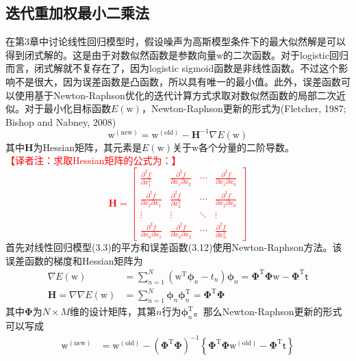 \documentclass[b5paper]{book}
\numberwithin{equation}{chapter}
\newcommand {\bw} {\boldsymbol{\mathrm{w}}}
\newcommand {\sft} {\boldsymbol{\mathsf{t}}}
\newcommand {\rmT} {\mathrm{T}}
\newcommand {\bfPhi} {\boldsymbol{\Phi}}
\newcommand {\bfphi} {\boldsymbol{\phi}}
\begin{document}
	\subsection{迭代重加权最小二乘法}
	\textnormal{在第3章中讨论线性回归模型时，假设噪声为高斯模型条件下的最大似然解是可以得到闭式解的。这是由于对数似然函数是参数向量$\bw$的二次函数。对于logistic回归而言，闭式解就不复存在了，因为logistic sigmoid函数是非线性函数。不过这个影响不是很大，因为误差函数是凸函数，所以具有唯一的最小值。此外，误差函数可以使用基于Newton-Raphson优化的迭代计算方式求取对数似然函数的局部二次近似。对于最小化目标函数$E(\bw)$，Newton-Raphson更新的形式为(Fletcher, 1987; Bishop and Nabney, 2008)
	\begin{equation}
		\bw^{(\mathrm{new})} = \bw^{(\mathrm{old})} - \mathbf{H}^{-1} \nabla E(\bw)
	\end{equation}
	其中$\mathbf{H}$为Hessian矩阵，其元素是$E(\bw)$关于$\bw$各个分量的二阶导数。\\
	\textcolor{red}{【译者注：求取Hessian矩阵的公式为：】
	\begin{equation*}
		\mathbf{H} = \left[\begin{matrix}
			\frac{\partial^2f}{\partial x_1^2} & \frac{\partial^2f}{\partial x_1 \partial x_2} & \cdots & \frac{\partial^2f}{\partial x_1 \partial x_n}\\
			\frac{\partial^2f}{\partial x_2 \partial x_1} & \frac{\partial^2f}{\partial x^2_2} & \cdots & \frac{\partial^2f}{\partial x_2 \partial x_n}\\
			\vdots & \vdots & \ddots & \vdots \\
			\frac{\partial^2f}{\partial x_n \partial x_1} & \frac{\partial^2f}{\partial x_n \partial x_2} & \cdots & \frac{\partial^2f}{\partial x^2_n}
		\end{matrix}\right]
	\end{equation*}}
	\indent 首先对线性回归模型(3.3)的平方和误差函数(3.12)使用Newton-Raphson方法。该误差函数的梯度和Hessian矩阵为
	\begin{align}
		\nabla E(\bw) &= \sum_{n=1}^N (\bw^{\rmT}\bfphi_n - t_n)\bfphi_n = \bfPhi^{\rmT}\bfPhi \bw - \bfPhi^{\rmT} \sft \\
		\mathbf{H} = \nabla \nabla E(\bw) &= \sum_{n=1}^N \bfphi_n \bfphi_n^{\rmT} = \bfPhi^{\rmT} \bfPhi
	\end{align}
	其中$\bfPhi$为$N \times M$维的设计矩阵，其第$n$行为$\bfphi_n^{\rmT}$。那么Newton-Raphson更新的形式可以写成
	\begin{equation}
	\begin{split}
		\bw^{\mathrm{(new)}} &= \bw^{\mathrm{(old)}} - \left(\bfPhi^{\rmT} \bfPhi \right)^{-1} \left\{\bfPhi^{\rmT}\bfPhi\bw^{\mathrm{(old)}} - \bfPhi^{\rmT}\sft\right\}\\

\end{split}
\end{equation}}
\end{document}
